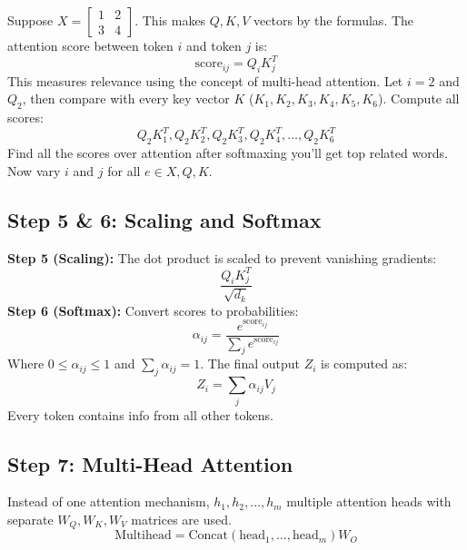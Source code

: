 \documentclass[10pt, conference]{IEEEtran}
\begin{document}
Suppose $X = \begin{bmatrix} 1 & 2 \\ 3 & 4 \end{bmatrix}$. This makes $Q, K, V$ vectors by the formulas. The attention score between token $i$ and token $j$ is:
\begin{equation}
    \text{score}_{ij} = Q_i K_j^T
\end{equation}
This measures relevance using the concept of multi-head attention. Let $i = 2$ and $Q_2$, then compare with every key vector $K$ ($K_1, K_2, K_3, K_4, K_5, K_6$). Compute all scores:
\begin{equation}
    Q_2K_1^T, Q_2K_2^T, Q_2K_3^T, Q_2K_4^T, \dots, Q_2K_6^T
\end{equation}
Find all the scores over attention after softmaxing you'll get top related words. Now vary $i$ and $j$ for all $e \in X, Q, K$.

\subsection{\textbf{Step 5 \& 6: Scaling and Softmax}}
\textbf{Step 5 (Scaling):} The dot product is scaled to prevent vanishing gradients:
\begin{equation}
    \frac{Q_i K_j^T}{\sqrt{d_k}}
\end{equation}
\textbf{Step 6 (Softmax):} Convert scores to probabilities:
\begin{equation}
    \alpha_{ij} = \frac{e^{\text{score}_{ij}}}{\sum_j e^{\text{score}_{ij}}}
\end{equation}
Where $0 \leq \alpha_{ij} \leq 1$ and $\sum_j \alpha_{ij} = 1$. The final output $Z_i$ is computed as:
\begin{equation}
    Z_i = \sum_j \alpha_{ij} V_j
\end{equation}
Every token contains info from all other tokens.

\subsection{\textbf{Step 7: Multi-Head Attention}}
Instead of one attention mechanism, $h_1, h_2, \dots, h_m$ multiple attention heads with separate $W_Q, W_K, W_V$ matrices are used.
\begin{equation}
    \text{Multihead} = \text{Concat}(\text{head}_1, \dots, \text{head}_m) W_O
\end{equation}
\end{document}
